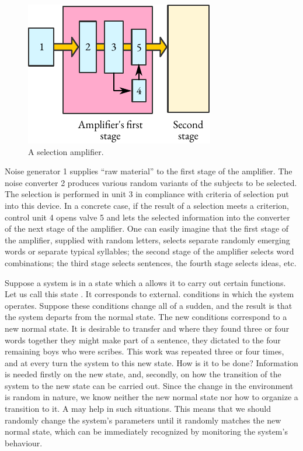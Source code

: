 \begin{figure}%
 \centering
 \includegraphics[width=\linewidth]{figures/selection-amp.pdf}
 \caption{A selection amplifier.\label{selection-amp}}
 \end{figure}
Noise generator 1 supplies ``raw material'' to the first stage of the
amplifier. The noise converter 2 produces various random variants of
the subjects to be selected. The selection is performed in unit 3 in
compliance with criteria of selection put into this device. In a concrete
case, if the result of a selection meets a criterion, control unit 4 opens
valve 5 and lets the selected information into the converter of the next
stage of the amplifier. One can easily imagine that the first stage of the
amplifier, supplied with random letters, selects separate randomly
emerging words or separate typical syllables; the second stage of the
amplifier selects word combinations; the third stage selects sentences,
the fourth stage selects ideas, etc.

 Suppose
a system is in a state which a allows it to carry out certain functions. Let
us call this state . It corresponds to external. conditions in which
the system operates. Suppose these conditions change all of a sudden,
and the result is that the system departs from the normal state. The new
conditions correspond to a new normal state. It is desirable to transfer
and where they found three or four words together they might make
part of a sentence, they dictated to the four remaining boys who were
scribes. This work was repeated three or four times, and at every turn
the system to this new state. How is it to be done? Information is
needed firstly on the new state, and, secondly, on how the transition of
the system to the new state can be carried out. Since the change in the
environment is random in nature, we know neither the new normal state
nor how to organize a transition to it. A  may help in
such situations. This means that we should randomly change the
system's parameters until it randomly matches the new normal state,
which can be immediately recognized by monitoring the system's
behaviour.

